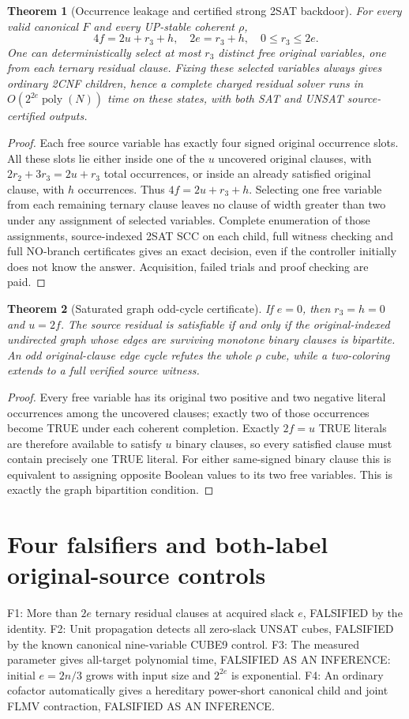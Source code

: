 \documentclass{article}
\newtheorem{theorem}{Theorem}
\begin{document}
\begin{theorem}[Occurrence leakage and certified strong 2SAT backdoor]
For every valid canonical $F$ and every UP-stable coherent $\rho$,
\[
\boxed{4f=2u+r_3+h,\quad 2e=r_3+h,\quad 0\le r_3\le2e.}
\]
One can deterministically select at most $r_3$ distinct free original variables, one from each ternary residual clause. Fixing these selected variables always gives ordinary 2CNF children, hence a complete charged residual solver runs in $O(2^{2e}\operatorname{poly}(N))$ time on these states, with both SAT and UNSAT source-certified outputs.
\end{theorem}
\begin{proof}
Each free source variable has exactly four signed original occurrence slots. All these slots lie either inside one of the $u$ uncovered original clauses, with $2r_2+3r_3=2u+r_3$ total occurrences, or inside an already satisfied original clause, with $h$ occurrences. Thus $4f=2u+r_3+h$. Selecting one free variable from each remaining ternary clause leaves no clause of width greater than two under any assignment of selected variables. Complete enumeration of those assignments, source-indexed 2SAT SCC on each child, full witness checking and full NO-branch certificates gives an exact decision, even if the controller initially does not know the answer. Acquisition, failed trials and proof checking are paid.
\end{proof}
\begin{theorem}[Saturated graph odd-cycle certificate]
If $e=0$, then $r_3=h=0$ and $u=2f$. The source residual is satisfiable if and only if the original-indexed undirected graph whose edges are surviving monotone binary clauses is bipartite. An odd original-clause edge cycle refutes the whole $\rho$ cube, while a two-coloring extends to a full verified source witness.
\end{theorem}
\begin{proof}
Every free variable has its original two positive and two negative literal occurrences among the uncovered clauses; exactly two of those occurrences become TRUE under each coherent completion. Exactly $2f=u$ TRUE literals are therefore available to satisfy $u$ binary clauses, so every satisfied clause must contain precisely one TRUE literal. For either same-signed binary clause this is equivalent to assigning opposite Boolean values to its two free variables. This is exactly the graph bipartition condition.
\end{proof}

\section{Four falsifiers and both-label original-source controls}
\noindent F1: More than $2e$ ternary residual clauses at acquired slack $e$, FALSIFIED by the identity. F2: Unit propagation detects all zero-slack UNSAT cubes, FALSIFIED by the known canonical nine-variable CUBE9 control. F3: The measured parameter gives all-target polynomial time, FALSIFIED AS AN INFERENCE: initial $e=2n/3$ grows with input size and $2^{2e}$ is exponential. F4: An ordinary cofactor automatically gives a hereditary power-short canonical child and joint FLMV contraction, FALSIFIED AS AN INFERENCE.
\end{document}
